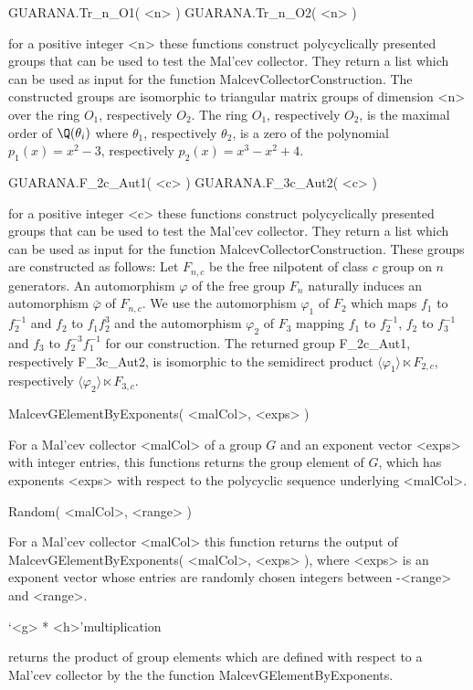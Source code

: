 \> GUARANA.Tr_n_O1( <n> )
\> GUARANA.Tr_n_O2( <n> )

for a positive integer <n> 
these functions construct polycyclically presented groups 
that can be used to test the Mal'cev collector.
They return a list which can be used as input for the function
MalcevCollectorConstruction.
The constructed groups are isomorphic to triangular matrix groups
of dimension <n> over the ring $O_1$, respectively $O_2$.
The ring $O_1$, respectively $O_2$, is the maximal order of 
$\Q(\theta_i)$ where
$\theta_1$, respectively $\theta_2$, is a zero of the polynomial 
$p_1(x) = x^2-3$, respectively 
$p_2(x)=x^3 -x^2 +4$.

\> GUARANA.F_2c_Aut1(  <c> )
\> GUARANA.F_3c_Aut2(  <c> )

for a positive integer <c> 
these functions construct polycyclically presented groups
that can be used to test the Mal'cev collector.
They return a list which can be used as input for the function
MalcevCollectorConstruction.
These groups are constructed as follows:
Let $F_{n,c}$ be the free nilpotent of class $c$ group on $n$ generators.
An automorphism $\varphi$ of the free group $F_n$ naturally induces
an automorphism
$\bar{\varphi}$ of $F_{n,c}$.
We use the automorphism $\varphi_1$ of $F_2$
which maps $f_1$ to $f_2^{-1}$ and $f_2$ to $f_1 f_2^3$
and the automorphism $\varphi_2$ of $F_3$ mapping
$f_1$ to $f_2^{-1}$, $f_2$ to $f_3^{-1}$ and $f_3$ to $f_2^{-3}f_1^{-1}$
for our construction.
The returned group F_2c_Aut1, respectively F_3c_Aut2, is 
isomorphic to the semidirect product 
 $\langle \varphi_1 \rangle \ltimes F_{2,c}$, respectively
 $\langle \varphi_2 \rangle \ltimes F_{3,c}$.


\> MalcevGElementByExponents( <malCol>, <exps> )

For a Mal'cev collector <malCol> of a group $G$ 
and an exponent vector <exps> with integer
entries, this functions returns the group element of $G$, which 
has exponents <exps> with respect to the polycyclic sequence 
underlying <malCol>.

\> Random( <malCol>, <range> )

For a Mal'cev collector <malCol> this function returns the output of 
MalcevGElementByExponents( <malCol>, <exps> ), where <exps> is an
exponent vector whose entries are randomly chosen integers between 
-<range> and <range>.

\> `<g> * <h>'{multiplication} 

returns the product of group elements which are defined with respect 
to a Mal'cev collector by the the function MalcevGElementByExponents.

